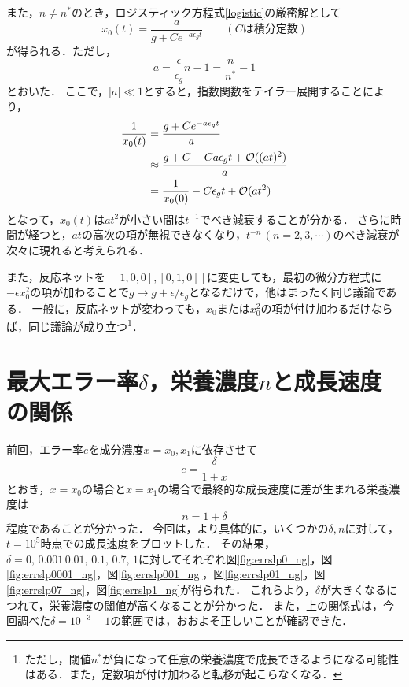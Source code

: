 \documentclass[a4paper,11pt]{jsarticle}
\begin{document}
また，$n \neq n^*$のとき，ロジスティック方程式\eqref{logistic}の厳密解として
\begin{equation}
  x_0(t) = \frac{a}{g + Ce^{-a\epsilon_g t}} \qquad (C\text{は積分定数})
\end{equation}
が得られる．ただし，
\begin{equation}
  a = \frac{\epsilon}{\epsilon_g} n - 1 = \frac{n}{n^*} - 1
\end{equation}
とおいた．
ここで，$\lvert a\rvert \ll 1$とすると，指数関数をテイラー展開することにより，
\begin{align}
  \frac{1}{x_0(t)} &= \frac{g + Ce^{-a\epsilon_g t}}{a} \notag\\
  &\approx \frac{g + C - Ca\epsilon_g t + \mathcal{O}((at)^2)}{a} \notag\\
  &= \frac{1}{x_0(0)} - C\epsilon_g t + \mathcal{O}(at^2)
\end{align}
となって，$x_0(t)$は$at^2$が小さい間は$t^{-1}$でべき減衰することが分かる．
さらに時間が経つと，$at$の高次の項が無視できなくなり，$t^{-n} \,(n=2,3,\cdots)$のべき減衰が次々に現れると考えられる．

また，反応ネットを$[[1,0,0],[0,1,0]]$に変更しても，最初の微分方程式に$-\epsilon x^2_0$の項が加わることで$g \to g + \epsilon/\epsilon_g$となるだけで，他はまったく同じ議論である．
一般に，反応ネットが変わっても，$x_0$または$x^2_0$の項が付け加わるだけならば，同じ議論が成り立つ\footnote{ただし，閾値$n^*$が負になって任意の栄養濃度で成長できるようになる可能性はある．また，定数項が付け加わると転移が起こらなくなる．}．

\section{最大エラー率$\delta$，栄養濃度$n$と成長速度の関係}

前回，エラー率$e$を成分濃度$x=x_0,x_1$に依存させて
\begin{equation}
  e = \frac{\delta}{1+x}
\end{equation}
とおき，$x=x_0$の場合と$x=x_1$の場合で最終的な成長速度に差が生まれる栄養濃度は
\begin{equation}
  n = 1 + \delta
\end{equation}
程度であることが分かった．
今回は，より具体的に，いくつかの$\delta, n$に対して，$t=10^5$時点での成長速度をプロットした．
その結果，$\delta=0,\,0.001\,0.01,\,0.1,\,0.7,\,1$に対してそれぞれ図\ref{fig:errslp0_ng}，図\ref{fig:errslp0001_ng}，図\ref{fig:errslp001_ng}，図\ref{fig:errslp01_ng}，図\ref{fig:errslp07_ng}，図\ref{fig:errslp1_ng}が得られた．
これらより，$\delta$が大きくなるにつれて，栄養濃度の閾値が高くなることが分かった．
また，上の関係式は，今回調べた$\delta=10^{-3} - 1$の範囲では，おおよそ正しいことが確認できた．
\end{document}
